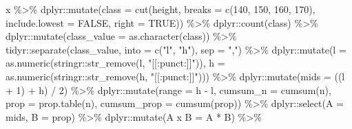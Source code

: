 \documentclass[
  12pt,
]{book}
\newenvironment{Shaded}{\begin{snugshade}}{\end{snugshade}}
\newcommand{\AttributeTok}[1]{\textcolor[rgb]{0.77,0.63,0.00}{#1}}
\newcommand{\ConstantTok}[1]{\textcolor[rgb]{0.00,0.00,0.00}{#1}}
\newcommand{\DecValTok}[1]{\textcolor[rgb]{0.00,0.00,0.81}{#1}}
\newcommand{\FunctionTok}[1]{\textcolor[rgb]{0.00,0.00,0.00}{#1}}
\newcommand{\NormalTok}[1]{#1}
\newcommand{\OtherTok}[1]{\textcolor[rgb]{0.56,0.35,0.01}{#1}}
\newcommand{\SpecialCharTok}[1]{\textcolor[rgb]{0.00,0.00,0.00}{#1}}
\newcommand{\StringTok}[1]{\textcolor[rgb]{0.31,0.60,0.02}{#1}}
\begin{document}
\begin{Shaded}
\begin{Highlighting}[]
\NormalTok{x }\SpecialCharTok{\%\textgreater{}\%} 
\NormalTok{  dplyr}\SpecialCharTok{::}\FunctionTok{mutate}\NormalTok{(}\AttributeTok{class =} \FunctionTok{cut}\NormalTok{(height,}
                            \AttributeTok{breaks =} \FunctionTok{c}\NormalTok{(}\DecValTok{140}\NormalTok{, }\DecValTok{150}\NormalTok{, }\DecValTok{160}\NormalTok{, }\DecValTok{170}\NormalTok{),}
                            \AttributeTok{include.lowest =} \ConstantTok{FALSE}\NormalTok{, }\AttributeTok{right =} \ConstantTok{TRUE}\NormalTok{)) }\SpecialCharTok{\%\textgreater{}\%} 
\NormalTok{  dplyr}\SpecialCharTok{::}\FunctionTok{count}\NormalTok{(class) }\SpecialCharTok{\%\textgreater{}\%} 
\NormalTok{  dplyr}\SpecialCharTok{::}\FunctionTok{mutate}\NormalTok{(}\AttributeTok{class\_value =} \FunctionTok{as.character}\NormalTok{(class)) }\SpecialCharTok{\%\textgreater{}\%} 
\NormalTok{  tidyr}\SpecialCharTok{::}\FunctionTok{separate}\NormalTok{(class\_value, }\AttributeTok{into =} \FunctionTok{c}\NormalTok{(}\StringTok{"l"}\NormalTok{, }\StringTok{"h"}\NormalTok{), }\AttributeTok{sep =} \StringTok{","}\NormalTok{) }\SpecialCharTok{\%\textgreater{}\%} 
\NormalTok{  dplyr}\SpecialCharTok{::}\FunctionTok{mutate}\NormalTok{(}\AttributeTok{l =} \FunctionTok{as.numeric}\NormalTok{(stringr}\SpecialCharTok{::}\FunctionTok{str\_remove}\NormalTok{(l, }\StringTok{"[[:punct:]]"}\NormalTok{)),}
                \AttributeTok{h =} \FunctionTok{as.numeric}\NormalTok{(stringr}\SpecialCharTok{::}\FunctionTok{str\_remove}\NormalTok{(h, }\StringTok{"[[:punct:]]"}\NormalTok{))) }\SpecialCharTok{\%\textgreater{}\%} 
\NormalTok{  dplyr}\SpecialCharTok{::}\FunctionTok{mutate}\NormalTok{(}\AttributeTok{mids =}\NormalTok{ ((l }\SpecialCharTok{+} \DecValTok{1}\NormalTok{) }\SpecialCharTok{+}\NormalTok{ h) }\SpecialCharTok{/} \DecValTok{2}\NormalTok{) }\SpecialCharTok{\%\textgreater{}\%} 
\NormalTok{  dplyr}\SpecialCharTok{::}\FunctionTok{mutate}\NormalTok{(}\AttributeTok{range =}\NormalTok{ h }\SpecialCharTok{{-}}\NormalTok{ l, }\AttributeTok{cumsum\_n =} \FunctionTok{cumsum}\NormalTok{(n),}
                \AttributeTok{prop =} \FunctionTok{prop.table}\NormalTok{(n), }\AttributeTok{cumsum\_prop =} \FunctionTok{cumsum}\NormalTok{(prop)) }\SpecialCharTok{\%\textgreater{}\%} 
\NormalTok{  dplyr}\SpecialCharTok{::}\FunctionTok{select}\NormalTok{(}\AttributeTok{A =}\NormalTok{ mids, }\AttributeTok{B =}\NormalTok{ prop) }\SpecialCharTok{\%\textgreater{}\%} 
\NormalTok{  dplyr}\SpecialCharTok{::}\FunctionTok{mutate}\NormalTok{(}\StringTok{\textasciigrave{}}\AttributeTok{A x B}\StringTok{\textasciigrave{}} \OtherTok{=}\NormalTok{ A }\SpecialCharTok{*}\NormalTok{ B) }\SpecialCharTok{\%\textgreater{}\%} 

\end{Highlighting}
\end{Shaded}
\end{document}
